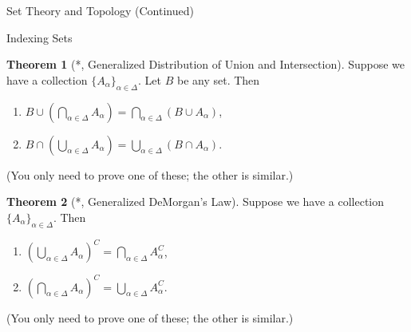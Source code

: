 \documentclass[11pt]{article}
\theoremstyle{definition}
\newtheorem{theorem}{Theorem}[section]
\begin{document}
\begin{section}{Set Theory and Topology (Continued)}
\begin{subsection}{Indexing Sets}
\begin{theorem}[*, Generalized Distribution of Union and Intersection]
Suppose we have a collection $\{A_{\alpha}\}_{\alpha\in\Delta}$.  Let $B$ be any set.  Then
\begin{enumerate}
\item $\displaystyle B \cup \left(\bigcap_{\alpha\in\Delta}A_{\alpha}\right)=\bigcap_{\alpha\in\Delta}(B\cup A_{\alpha})$,
\item $\displaystyle B \cap \left(\bigcup_{\alpha\in\Delta}A_{\alpha}\right)=\bigcup_{\alpha\in\Delta}(B\cap A_{\alpha})$.
\end{enumerate}
(You only need to prove one of these; the other is similar.)
\end{theorem}

\begin{theorem}[*, Generalized DeMorgan's Law]
Suppose we have a collection $\{A_{\alpha}\}_{\alpha\in\Delta}$.  Then
\begin{enumerate}
\item $\displaystyle \left(\bigcup_{\alpha\in\Delta} A_{\alpha}\right)^C=\bigcap_{\alpha\in\Delta}A_{\alpha}^{C}$,
\item $\displaystyle \left(\bigcap_{\alpha\in\Delta} A_{\alpha}\right)^C=\bigcup_{\alpha\in\Delta}A_{\alpha}^{C}$.
\end{enumerate}
(You only need to prove one of these; the other is similar.)
\end{theorem}

\end{subsection}

\end{section}
\end{document}

